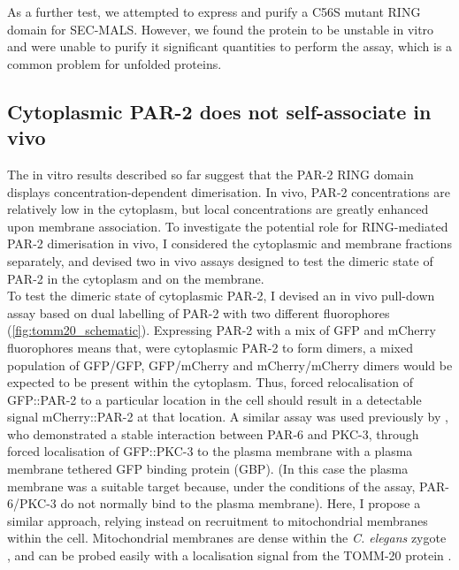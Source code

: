 \documentclass[12pt]{"report"}
\begin{document}
As a further test, we attempted to express and purify a C56S mutant RING domain for SEC-MALS. However, we found the protein to be unstable in vitro and were unable to purify it significant quantities to perform the assay, which is a common problem for unfolded proteins.\\

\subsection{Cytoplasmic PAR-2  does not self-associate in vivo}

The in vitro results described so far suggest that the PAR-2 RING domain displays concentration-dependent dimerisation. In vivo, PAR-2 concentrations are relatively low in the cytoplasm, but local concentrations are greatly enhanced upon membrane association. To investigate the potential role for RING-mediated PAR-2 dimerisation in vivo, I considered the cytoplasmic and membrane fractions separately, and devised two in vivo assays designed to test the dimeric state of PAR-2 in the cytoplasm and on the membrane.\\

To test the dimeric state of cytoplasmic PAR-2, I devised an in vivo pull-down assay based on dual labelling of PAR-2 with two different fluorophores (\cref{fig:tomm20_schematic}). Expressing PAR-2 with a mix of GFP and mCherry fluorophores means that, were cytoplasmic PAR-2 to form dimers, a mixed population of GFP/GFP, GFP/mCherry and mCherry/mCherry dimers would be expected to be present within the cytoplasm. Thus, forced relocalisation of GFP::PAR-2 to a particular location in the cell should result in a detectable signal mCherry::PAR-2 at that location. A similar assay was used previously by \textcite{Reich2019}, who demonstrated a stable interaction between PAR-6 and PKC-3, through forced localisation of GFP::PKC-3 to the plasma membrane with a plasma membrane tethered GFP binding protein (GBP). (In this case the plasma membrane was a suitable target because, under the conditions of the assay, PAR-6/PKC-3 do not normally bind to the plasma membrane). Here, I propose a similar approach, relying instead on recruitment to mitochondrial membranes within the cell. Mitochondrial membranes are dense within the \textit{C. elegans} zygote \citep{Dinkelmann2003}, and can be probed easily with a localisation signal from the TOMM-20 protein \citep{Watanabe2011}.\\
\end{document}
